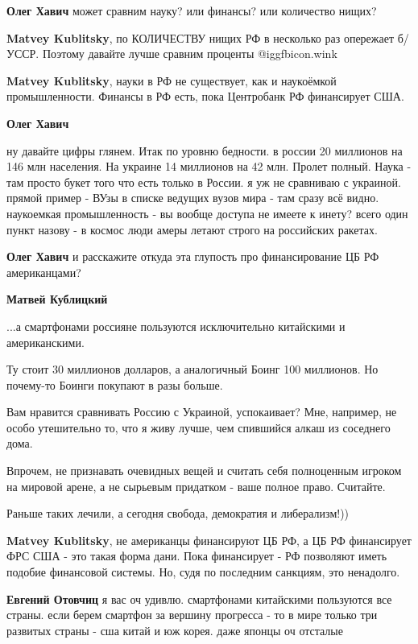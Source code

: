 \begin{itemize}
\begin{itemize}
\textbf{Олег Хавич} может сравним науку? или финансы? или количество нищих?

\textbf{Matvey Kublitsky}, по КОЛИЧЕСТВУ нищих РФ в несколько раз опережает б/УССР. Поэтому давайте лучше сравним проценты  @igg{fbicon.wink} 

\textbf{Matvey Kublitsky}, науки в РФ не существует, как и наукоёмкой промышленности. Финансы в РФ есть, пока Центробанк РФ финансирует США.

\textbf{Олег Хавич} 

ну давайте цифры глянем. Итак по уровню бедности. в россии 20 миллионов на 146
млн населения. На украине 14 миллионов на 42 млн. Пролет полный. Наука - там
просто букет того что есть только в России. я уж не сравниваю с украиной.
прямой пример - ВУзы в списке ведущих вузов мира - там сразу всё видно.
наукоемкая промышленность - вы вообще доступа не имеете к инету? всего один
пункт назову - в космос люди амеры летают строго на российских ракетах.

\textbf{Олег Хавич} и расскажите откуда эта глупость про финансирование ЦБ РФ американцами?

\textbf{Матвей Кублицкий} 

...а смартфонами россияне пользуются исключительно китайскими и американскими.

Ту стоит 30 миллионов долларов, а аналогичный Боинг 100 миллионов. Но почему-то Боинги покупают в разы больше.

Вам нравится сравнивать Россию с Украиной, успокаивает? Мне, например, не особо
утешительно то, что я живу лучше, чем спившийся алкаш из соседнего дома.

Впрочем, не признавать очевидных вещей и считать себя полноценным игроком на
мировой арене, а не сырьевым придатком - ваше полное право. Считайте.

Раньше таких лечили, а сегодня свобода, демократия и либерализм!))

\textbf{Matvey Kublitsky}, не американцы финансируют ЦБ РФ, а ЦБ РФ финансирует ФРС США - это такая форма дани. Пока финансирует - РФ позволяют иметь подобие финансовой системы. Но, судя по последним санкциям, это ненадолго.

\textbf{Евгений Отовчиц} я вас оч удивлю. смартфонами китайскими пользуются все страны. если берем смартфон за вершину прогресса - то в мире только три развитых страны - сша китай и юж корея. даже японцы оч отсталые


\end{itemize}
\end{itemize}

